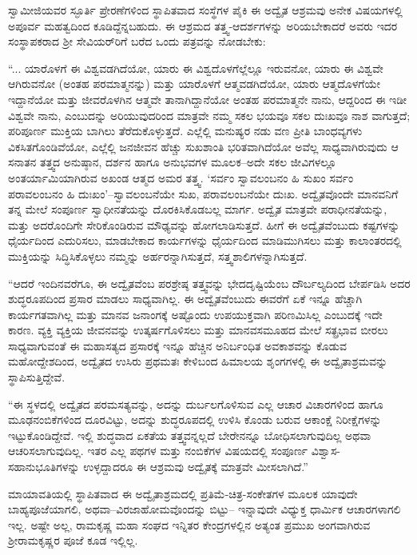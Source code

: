 ಸ್ವಾಮೀಜಿಯವರ ಸ್ಫೂರ್ತಿ ಪ್ರೇರಣೆಗಳಿಂದ ಸ್ಥಾಪಿತವಾದ ಸಂಸ್ಥೆಗಳ ಪೈಕಿ ಈ ಅದ್ವೈತ ಆಶ್ರಮವು ಅನೇಕ ವಿಷಯಗಳಲ್ಲಿ ಅಪೂರ್ವ ಮಹತ್ವದಿಂದ ಕೂಡಿದ್ದೆನ್ನಬಹುದು. ಈ ಆಶ್ರಮದ ತತ್ತ್ವ-ಆದರ್ಶಗಳನ್ನು ಅರಿಯಬೇಕಾದರೆ ಅವರು ಇದರ ಸಂಸ್ಥಾಪಕರಾದ ಶ್ರೀ ಸೇವಿಯರ್​ರಿಗೆ ಬರೆದ ಒಂದು ಪತ್ರವನ್ನು ನೋಡಬೇಕು:

“... ಯಾರೊಳಗೆ ಈ ವಿಶ್ವವಡಗಿದೆಯೋ, ಯಾರು ಈ ವಿಶ್ವದೊಳಗೆಲ್ಲೆಲ್ಲೂ ಇರುವನೋ, ಯಾರು ಈ ವಿಶ್ವವೇ ಆಗಿರುವನೋ (ಅಂತಹ ಪರಮಾತ್ಮನನ್ನು) ಮತ್ತು ಯಾರೊಳಗೆ ಆತ್ಮವಡಗಿದೆಯೋ, ಯಾರು ಆತ್ಮದೊಳಗೆಯೇ ಇದ್ದಾನೆಯೋ ಮತ್ತು ಜೀವರೊಳಗಿನ ಆತ್ಮವೇ ತಾನಾಗಿದ್ದಾನೆಯೋ ಅಂತಹ ಪರಮಾತ್ಮನೇ ನಾನು, ಆದ್ದರಿಂದ ಈ ಇಡೀ ವಿಶ್ವವೇ ನಾನು, ಎಂಬುದನ್ನು ಅರಿಯುವುದರಿಂದ ಮಾತ್ರವೇ ನಮ್ಮ ಸಕಲ ಭಯವೂ ಸಕಲ ದುಃಖವೂ ನಾಶ ವಾಗುತ್ತದೆ; ಪರಿಪೂರ್ಣ ಮುಕ್ತಿಯ ಬಾಗಿಲು ತೆರೆದುಕೊಳ್ಳುತ್ತದೆ. ಎಲ್ಲೆಲ್ಲಿ ಮನುಷ್ಯರ ನಡು ವಣ ಪ್ರೀತಿ ಬಾಂಧವ್ಯಗಳು ವಿಕಸಿತಗೊಂಡಿವೆಯೋ, ಎಲ್ಲೆಲ್ಲಿ ಜನಜೀವನ ಹೆಚ್ಚು ಸುಖಶಾಂತಿ ಭರಿತವಾಗಿದೆಯೋ ಅವೆಲ್ಲ ಸಾಧ್ಯವಾಗಿರುವುದು ಆ ಸನಾತನ ತತ್ತ್ವದ ಅನುಷ್ಠಾನ, ದರ್ಶನ ಹಾಗೂ ಅನುಭವಗಳ ಮೂಲಕ–ಅದೇ ಸಕಲ ಜೀವಿಗಳಲ್ಲೂ ಅಂತರ್ಯಾಮಿಯಾಗಿರುವ ಅಖಂಡ ಆತ್ಮದ ಅಮರ ತತ್ತ್ವ. ‘ಸರ್ವಂ ಸ್ವಾವಲಂಬನಂ ಹಿ ಸುಖಂ ಸರ್ವಂ ಪರಾವಲಂಬನಂ ಹಿ ದುಃಖಂ’–ಸ್ವಾವಲಂಬನೆಯೇ ಸುಖ, ಪರಾವಲಂಬನೆಯೇ ದುಃಖ. ಅದ್ವೈತವೊಂದೇ ಮಾನವನಿಗೆ ತನ್ನ ಮೇಲೆ ಸಂಪೂರ್ಣ ಸ್ವಾಧೀನತೆಯನ್ನು ದೊರಕಿಸಿಕೊಡಬಲ್ಲ ಮಾರ್ಗ. ಅದ್ವೈತ ಮಾತ್ರವೇ ಪರಾಧೀನತೆಯನ್ನು, ಮತ್ತು ಅದರೊಂದಿಗೇ ಸೇರಿಕೊಂಡಿರುವ ಮೌಢ್ಯವನ್ನು ಹೋಗಲಾಡಿಸುತ್ತದೆ. ಹೀಗೆ ಈ ಅದ್ವೈತವೆಂಬುದು ಕಷ್ಟಗಳನ್ನು ಧೈರ್ಯದಿಂದ ಎದುರಿಸಲು, ಮಾಡಬೇಕಾದ ಕಾರ್ಯಗಳನ್ನು ಧೈರ್ಯದಿಂದ ಮಾಡಿಮುಗಿಸಲು ಮತ್ತು ಕಾಲಾಂತರದಲ್ಲಿ ಮುಕ್ತಿಯನ್ನು ಸಿದ್ಧಿಸಿಕೊಳ್ಳಲು ನಮ್ಮನ್ನು ಅರ್ಹರನ್ನಾಗಿಸುತ್ತದೆ, ಸತ್ತ್ವಶಾಲಿಗಳನ್ನಾಗಿಸುತ್ತದೆ.

“ಆದರೆ ಇಂದಿನವರೆಗೂ, ಈ ಅದ್ವೈತವೆಂಬ ಪರಶ್ರೇಷ್ಠ ತತ್ತ್ವವನ್ನು ಭೇದದೃಷ್ಟಿಯೆಂಬ ದೌರ್ಬಲ್ಯದಿಂದ ಬೇರ್ಪಡಿಸಿ ಅದರ ಶುದ್ಧರೂಪದಿಂದ ಪ್ರಸಾರ ಮಾಡಲು ಸಾಧ್ಯವಾಗಿಲ್ಲ. ಈ ಅದ್ವೈತವೆಂಬುದು ಈವರೆಗೆ ಏಕೆ ಇನ್ನೂ ಹೆಚ್ಚಾಗಿ ಕಾರ್ಯಗತವಾಗಿಲ್ಲ ಮತ್ತು ಮಾನವ ಜನಾಂಗಕ್ಕೆ ಅಷ್ಟೊಂದು ಉಪಯುಕ್ತವಾಗಿ ಪರಿಣಮಿಸಿಲ್ಲ ಎಂಬುದಕ್ಕೆ ಇದೇ ಕಾರಣ. ವ್ಯಕ್ತಿ ವ್ಯಕ್ತಿಯ ಜೀವನವನ್ನು ಉತ್ಕರ್ಷಗೊಳಿಸಲು ಮತ್ತು ಮಾನವಸಮೂಹದ ಮೇಲೆ ಸತ್ಪ್ರಭಾವ ಬೀರಲು ಸಾಧ್ಯವಾಗುವಂತೆ ಈ ಮಹಾಸತ್ಯದ ಪ್ರಸಾರಕ್ಕೆ ಇನ್ನೂ ಹೆಚ್ಚಿನ ಅನಿರ್ಬಂಧಿತ ಅವಕಾಶವನ್ನು ಕೊಡುವ ಮಹೋದ್ದೇಶದಿಂದ, ಅದ್ವೈತದ ಉಸಿರು ಪ್ರಥಮತಃ ಕೇಳಿಬಂದ ಹಿಮಾಲಯ ಶೃಂಗಗಳಲ್ಲಿ ಈ ಅದ್ವೈತಾಶ್ರಮವನ್ನು ಸ್ಥಾಪಿಸುತ್ತಿದ್ದೇವೆ.

“ಈ ಸ್ಥಳದಲ್ಲಿ ಅದ್ವೈತದ ಪರಮಸತ್ಯವನ್ನು, ಅದನ್ನು ದುರ್ಬಲಗೊಳಿಸುವ ಎಲ್ಲ ಆಚಾರ ವಿಚಾರಗಳಿಂದ ಹಾಗೂ ಮೂಢನಂಬಿಕೆಗಳಿಂದ ದೂರವಿಟ್ಟು, ಅದನ್ನು ಶುದ್ಧರೂಪದಲ್ಲಿ ಉಳಿಸಿ ಕೊಂಡು ಬರುವ ಆಕಾಂಕ್ಷೆ ನಿರೀಕ್ಷೆಗಳನ್ನು ಇಟ್ಟುಕೊಂಡಿದ್ದೇವೆ. ಇಲ್ಲಿ ಶುದ್ಧವಾದ ಏಕತೆಯ ತತ್ತ್ವವನ್ನಲ್ಲದೆ ಬೇರೇನನ್ನೂ ಬೋಧಿಸಲಾಗುವುದಿಲ್ಲ ಅಥವಾ ಆಚರಿಸಲಾಗುವುದಿಲ್ಲ. ಇತರ ಎಲ್ಲ ಪಥಗಳ ಮತ್ತು ನಂಬಿಕೆಗಳ ವಿಷಯದಲ್ಲಿ ಸಂಪೂರ್ಣ ವಿಶ್ವಾಸ-ಸಹಾನುಭೂತಿಗಳನ್ನು ಉಳ್ಳದ್ದಾದರೂ ಈ ಆಶ್ರಮವು ಅದ್ವೈತಕ್ಕೆ ಮಾತ್ರವೇ ಮೀಸಲಾಗಿದೆ.”

ಮಾಯಾವತಿಯಲ್ಲಿ ಸ್ಥಾಪಿತವಾದ ಈ ಅದ್ವೈತಾಶ್ರಮದಲ್ಲಿ ಪ್ರತಿಮೆ-ಚಿತ್ರ-ಸಂಕೇತಗಳ ಮೂಲಕ ಯಾವುದೇ ಬಾಹ್ಯಪೂಜೆಯಾಗಲಿ, ಅಥವಾ–ವಿರಜಾಹೋಮವೊಂದನ್ನು ಬಿಟ್ಟು– ಇನ್ನಾವುದೇ ವಿಧ್ಯುಕ್ತ ಧಾರ್ಮಿಕ ಆಚಾರಗಳಾಗಲಿ ಇಲ್ಲ. ಅಷ್ಟೇ ಅಲ್ಲ, ರಾಮಕೃಷ್ಣ ಮಹಾ ಸಂಘದ ಇನ್ನಿತರ ಕೇಂದ್ರಗಳಲ್ಲಿನ ಅತ್ಯಂತ ಪ್ರಮುಖ ಅಂಗವಾಗಿರುವ ಶ್ರೀರಾಮಕೃಷ್ಣರ ಪೂಜೆ ಕೂಡ ಇಲ್ಲಿಲ್ಲ.

